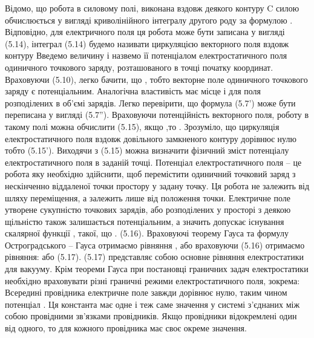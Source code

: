 Відомо, що робота в силовому полі, виконана вздовж деякого контуру C силою   обчислюється у вигляді  криволінійного інтегралу другого роду за формулою 
 . Відповідно, для електричного поля ця робота може бути записана у вигляді   							(5.14), 
інтеграл (5.14) будемо називати циркуляцією векторного поля вздовж контуру  
Введемо величину  		  і назвемо її потенціалом електростатичного поля одиничного точкового заряду, розташованого в точці початку координат. Враховуючи (5.10), легко бачити, що  , тобто векторне поле одиничного точкового заряду є потенціальним. Аналогічна властивість має місце і для поля розподілених в об'ємі зарядів. 
Легко перевірити, що формула (5.7') може бути переписана у вигляді  							(5.7'').
Враховуючи потенційність векторного поля, роботу в такому полі можна обчислити 
 					(5.15), якщо  ,то  .
Зрозуміло, що  циркуляція  електростатичного поля вздовж довільного замкненого контуру дорівнює нулю тобто  				(5.15').
Виходячи з (5.15) можна визначити фізичний зміст потенціалу електростатичного поля в заданій точці. Потенціал електростатичного поля – це робота яку необхідно здійснити, щоб перемістити одиничний точковий заряд з нескінченно віддаленої точки простору у задану точку. Ця робота не залежить від шляху переміщення, а залежить лише від положення точки.
Електричне поле утворене сукупністю точкових зарядів, або розподілених у просторі з деякою щільністю також залишається потенціальним, а значить допускає існування скалярної функції  , такої, що  .		(5.16).
Враховуючі теорему Гауса та формулу Остроградського – Гауса отримаємо  рівняння  , або враховуючи (5.16) отримаємо  рівняння:
   або 	 						(5.17).
(5.17) представляє собою основне рівняння електростатики для вакууму.
Крім теореми Гауса при постановці граничних задач електростатики необхідно враховувати різні граничні режими електростатичного поля, зокрема:
Всередині провідника електричне поле   завжди дорівнює нулю, таким чином потенціал  . Ця константа має одне і теж саме значення у системі з'єднаних між собою провідними зв'язками провідників. Якщо провідники відокремлені один від одного, то   для кожного провідника має своє окреме значення.


